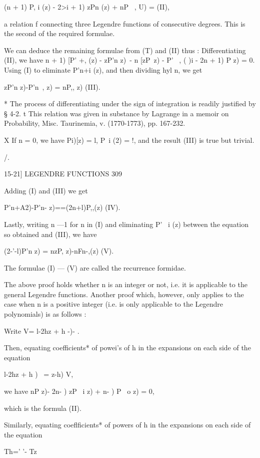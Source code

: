 {(n + 1) P, i (z) -  2>i + 1) zPn (z) + nP \ , U) = (II), 

a relation f connecting three Legendre functions of consecutive degrees. This 
is the second of the required formulae. 

We can deduce the remaining formulae from (T) and (II) thus : 
Differentiating (II), we have 
 n + 1) [P' +, (z) - zP'n  z)\ - n [zP\  z) - P' \ , ( )i -  2n + 1) P   z) = 0. 
Using (I) to eliminate P'n+i (z), and then dividing hyl n, we get 

zP'n z)-P'n\ , z) = nP,, z) (III). 

* The process of differentiating under the sign of integration is readily justified by § 4-2. 
t This relation was given in substance by Lagrange in a memoir on Probability, Misc. 
Taurinemia, v. (1770-1773), pp. 167-232. 

X If n = 0, we have Pi)[z) = l, P\ i (2) = !, and the result (III) is true but trivial. 



/. 



15-21] LEGENDRE FUNCTIONS 309 

Adding (I) and (III) we get 

P'n+A2)-P'n-  z)==(2n+l)P,,(z) (IV). 

Lastly, writing n —1 for n in (I) and eliminating P' \ i (z) between the 
equation so obtained and (III), we have 

(2-'-l)P'n z) = nzP, z)-nFn-,(z) (V). 

The formulae (I) — (V) are called the recurrence formidae. 

The above proof holds whether n is an integer or not, i.e. it is applicable to the general 
Legendre functions. Another proof which, however, only applies to the case when n is 
a positive integer (i.e. is only applicable to the Legendre polynomials) is as follows : 

Write V= l-2hz + h -)- . 

Then, equating coefficients* of powei's of h in the expansions on each side of the 
equation 

 l-2hz + h )~ =  z-h) V, 

we have nP  z)- 2n- ) zP \ i z) +  n- )  P \ o z) = 0, 

which is the formula (II). 

Similarly, equating coeflficients* of powers of h in the expansions on each side of the 
equation 

 Th=' '- Tz  



}
